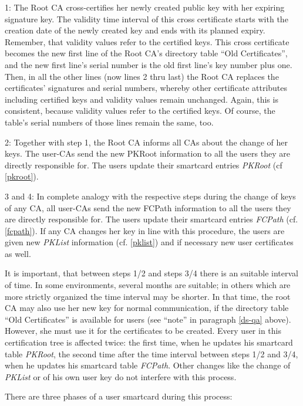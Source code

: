 1: The Root CA cross-certifies her newly created public key
with her expiring signature key.
The validity time interval of this cross certificate starts
with the creation date of the newly created key
and ends with its planned expiry.
Remember, that validity values refer to the certified keys.
This cross certificate becomes the new first line of the Root CA's
directory table ``Old Certificates'',
and the new first line's serial number is the old first line's
key number plus one.
Then, in all the other lines (now lines 2 thru last) the Root CA replaces
the certificates' signatures and serial numbers,
whereby other certificate attributes including
certified keys and validity values remain unchanged.
Again, this is consistent, because
validity values refer to the certified keys.
Of course, the table's serial numbers of those lines remain the same, too.

2: Together with step 1,
the Root CA informs all CAs about the change of her keys.
The user-CAs
send the new PKRoot information to all the users they are
directly responsible for.
The users update their smartcard entries {\em PKRoot} (cf \ref{pkroot}).

3 and 4: In complete analogy with the respective steps
during the change of keys of any CA,
all user-CAs
send the new FCPath information to all the users they are
directly responsible for.
The users update their smartcard entries {\em FCPath} (cf. \ref{fcpath}).
If any CA changes her key in line with this procedure,
the users are given new {\em PKList} information (cf. \ref{pklist})
and if necessary new user certificates as well.

It is important, that between steps 1/2 and steps 3/4
there is an suitable interval of time.
In some environments, several months are suitable;
in others which are more strictly organized the time interval may be shorter.
In that time, the root CA may also use her new key for normal communication, 
if the directory table ``Old Certificates'' is available for users
(see ``note'' in paragraph \ref{ds-qa} above).
However, she must use it for the certificates to be created.
Every user in this certification tree is affected twice:
the first time, when he updates his smartcard table {\em PKRoot},
the second time after the time interval between steps 1/2 and 3/4,
when he updates his smartcard table {\em FCPath}.
Other changes like the change of {\em PKList} or of his own user key do not
interfere with this process.

There are three phases of a user smartcard during this process:

